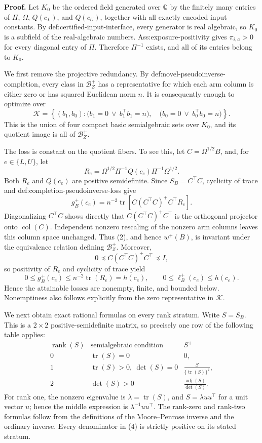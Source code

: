 \textbf{Proof.}
Let \(K_0\) be the ordered field generated over \(\mathbb Q\) by the finitely many entries of \(\Pi\), \(\Omega\), \(Q(c_L)\), and \(Q(c_U)\), together with all exactly encoded input constants.  By def:certified-input-interface, every generator is real algebraic, so \(K_0\) is a subfield of the real-algebraic numbers.  Ass:exposure-positivity gives \(\pi_{i,a}>0\) for every diagonal entry of \(\Pi\).  Therefore \(\Pi^{-1}\) exists, and all of its entries belong to \(K_0\).

We first remove the projective redundancy.  By def:novel-pseudoinverse-completion, every class in \(\mathcal B_Z^+\) has a representative for which each arm column is either zero or has squared Euclidean norm \(n\).  It is consequently enough to optimize over
\[
\mathcal K=
\left\{(b_1,b_0):
\bigl(b_1=0\ \vee\ b_1^{\top}b_1=n\bigr),\quad
\bigl(b_0=0\ \vee\ b_0^{\top}b_0=n\bigr)
\right\}.
\tag{1}
\]
This is the union of four compact basic semialgebraic sets over \(K_0\), and its quotient image is all of \(\mathcal B_Z^+\).

The loss is constant on the quotient fibers.  To see this, let \(C=\Omega^{1/2}B\), and, for \(e\in\{L,U\}\), let
\[
R_e=\Omega^{1/2}\Pi^{-1}Q(c_e)\Pi^{-1}\Omega^{1/2}.
\]
Both \(R_e\) and \(Q(c_e)\) are positive semidefinite.  Since \(S_B=C^{\top}C\), cyclicity of trace and def:completion-pseudoinverse-loss give
\[
g_B^+(c_e)
=n^{-2}\operatorname{tr}\!\left[
C(C^{\top}C)^+C^{\top}R_e
\right].
\tag{2}
\]
Diagonalizing \(C^{\top}C\) shows directly that
\(C(C^{\top}C)^+C^{\top}\) is the orthogonal projector onto \(\operatorname{col}(C)\).  Independent nonzero rescaling of the nonzero arm columns leaves this column space unchanged.  Thus (2), and hence \(w^+(B)\), is invariant under the equivalence relation defining \(\mathcal B_Z^+\).  Moreover,
\[
0\preceq C(C^{\top}C)^+C^{\top}\preceq I,
\]
so positivity of \(R_e\) and cyclicity of trace yield
\[
0\le g_B^+(c_e)
\le n^{-2}\operatorname{tr}(R_e)=h(c_e),
\qquad
0\le \ell_B^+(c_e)\le h(c_e).
\tag{3}
\]
Hence the attainable losses are nonempty, finite, and bounded below.  Nonemptiness also follows explicitly from the zero representative in \(\mathcal K\).

We next obtain exact rational formulas on every rank stratum.  Write \(S=S_B\).  This is a \(2\times2\) positive-semidefinite matrix, so precisely one row of the following table applies:
\[
\begin{array}{c|c|c}
\operatorname{rank}(S)&\text{semialgebraic condition}&S^+\\ \hline
0&\operatorname{tr}(S)=0&0,\\[2mm]
1&\operatorname{tr}(S)>0,\ \det(S)=0&
\displaystyle\frac{S}{\{\operatorname{tr}(S)\}^2},\\[3mm]
2&\det(S)>0&
\displaystyle\frac{\operatorname{adj}(S)}{\det(S)}.
\end{array}
\tag{4}
\]
For rank one, the nonzero eigenvalue is \(\lambda=\operatorname{tr}(S)\), and \(S=\lambda uu^{\top}\) for a unit vector \(u\); hence the middle expression is \(\lambda^{-1}uu^{\top}\).  The rank-zero and rank-two formulas follow from the definitions of the Moore--Penrose inverse and the ordinary inverse.  Every denominator in (4) is strictly positive on its stated stratum.

